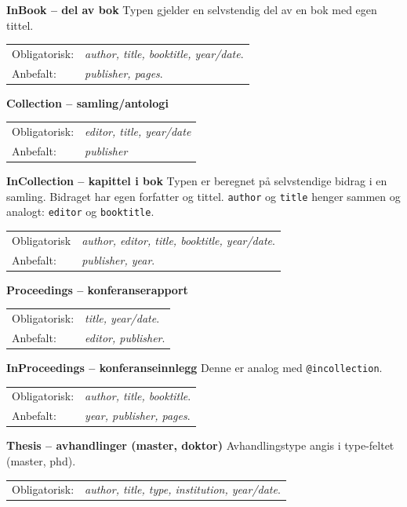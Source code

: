 \documentclass[11pt,norsk,a4paper]{article}
\newcommand{\bt}{BibTeX{}}
\newcommand{\underskrift}[1]{\vspace{.2cm}\noindent\textbf{#1}\newline}
\newcommand{\flipp}{\vspace{0.1cm}\newline\indent}
\newcommand{\mnd}{Obligatorisk}
\begin{document}
\underskrift{InBook -- del av  bok}
\noindent{}Typen gjelder en selvstendig del av en bok med egen tittel.
\flipp\begin{tabular}{ll}
\mnd:&\textit{author, title, booktitle, year/date}.\\
Anbefalt: &\textit{publisher, pages}.\\
\end{tabular}

\underskrift{Collection -- samling/antologi}
\indent\begin{tabular}{ll}
\mnd:&\textit{editor, title, year/date}\\
Anbefalt:&\textit{publisher}\\ 
\end{tabular}

\underskrift{InCollection -- kapittel i bok}
\noindent{}Typen er beregnet på selvstendige bidrag i en samling. Bidraget har egen forfatter og tittel. \texttt{author} og \texttt{title} henger sammen og analogt: \texttt{editor} og \texttt{booktitle}.\flipp\begin{tabular}{ll}
\mnd&\textit{author, editor, title, booktitle, year/date}. \\
Anbefalt: &\textit{publisher, year}.\\ 
\end{tabular}

\underskrift{Proceedings -- konferanserapport}
\indent\begin{tabular}{ll}
\mnd:&\textit{title, year/date}. \\
Anbefalt: &\textit{editor, publisher}.\\ 
\end{tabular}

\underskrift{InProceedings -- konferanseinnlegg}
Denne er analog med \verb=@incollection=.
\flipp\begin{tabular}{ll}
\mnd:&\textit{author, title, booktitle}. \\
Anbefalt: &\textit{year, publisher, pages}.\\ 
\end{tabular}

\underskrift{Thesis -- avhandlinger (master, doktor)}
Avhandlingstype angis i type-feltet (master, phd).
\flipp\begin{tabular}{ll}
\mnd:&\textit{author, title, type, institution,
  year/date}. \\ 
\end{tabular}
\end{document}
